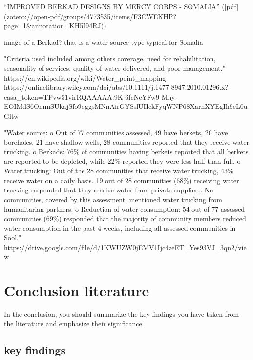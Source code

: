 {{“IMPROVED BERKAD DESIGNS BY MERCY CORPS - SOMALIA” ([pdf](zotero://open-pdf/groups/4773535/items/F3CWEKHP?page=1&annotation=KH5I94RJ))

image of a Berkad? that is a water source type typical for Somalia

"Criteria used included among others coverage, need for rehabilitation, seasonality of services, quality of water delivered, and poor management." https://en.wikipedia.org/wiki/Water_point_mapping
https://onlinelibrary.wiley.com/doi/abs/10.1111/j.1477-8947.2010.01296.x?casa_token=TPvw51virRQAAAAA:9K-6fcNcYFw9-Mny-EOIMdS6OmmSUkajSfo9qggsMNnAirGYSslUHckFyqWNP68XarnXYEgIh9eL0uGltw

"Water source:
o Out of 77 communities assessed, 49 have berkets, 26 have boreholes, 21 have shallow
wells, 28 communities reported that they receive water trucking.
o Berkads: 76\% of communities having berkets reported that all berkets are reported to be
depleted, while 22\% reported they were less half than full.
o Water trucking: Out of the 28 communities that receive water trucking, 43\% receive water
on a daily basis. 19 out of 28 communities (68\%) receiving water trucking responded that
they receive water from private suppliers. No communities, covered by this assessment,
mentioned water trucking from humanitarian partners.
o Reduction of water consumption: 54 out of 77 assessed communities (69\%) responded
that the majority of community members reduced water consumption in the past 4 weeks,
including all assessed communities in Sool." https://drive.google.com/file/d/1KWUZW0jEMV1Ijc4zeET_Yes93VJ_3qn2/view


\section{Conclusion literature}
In the conclusion, you should summarize the key findings you have taken from the literature and emphasize their significance.

\subsection{key findings}


}}

